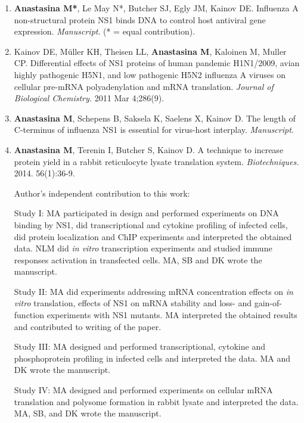 \documentclass[a4paper,12pt]{article} %
\begin{document}
	\begin{enumerate}[I]

	\item \textbf{Anastasina M*}, Le May N*, Butcher SJ, Egly JM, Kainov DE. Influenza A non-structural protein NS1 binds DNA to control host antiviral gene expression. \textit{Manuscript}. (* = equal contribution). \label{DNA}	
	\item 	Kainov DE, M{\"u}ller KH, Theisen LL, \textbf{Anastasina M}, Kaloinen M, Muller CP. Differential effects of NS1 proteins of human pandemic H1N1/2009, avian highly pathogenic H5N1, and low pathogenic H5N2 influenza A viruses on cellular pre-mRNA polyadenylation and mRNA translation. \textit{Journal of Biological Chemistry.} 2011 Mar 4;286(9). \label{Transl}		
	\item \textbf{Anastasina M}, Schepens B, Saksela K, Saelens X, Kainov D. The length of C-terminus of influenza NS1 is essential for virus-host interplay. \textit{Manuscript}. \label{Cterm}	
	\item \textbf{Anastasina M}, Terenin I, Butcher S, Kainov D. A technique to increase protein yield in a rabbit reticulocyte lysate translation system. \textit{Biotechniques.} 2014. 56(1):36-9. \label{RRL}
	
	\pagebreak
	Author's independent contribution to this work:
	\vspace{2 mm}
	
	Study I: MA participated in design and performed experiments on DNA binding by NS1, did transcriptional and cytokine profiling of infected cells, did protein localization and ChIP experiments and interpreted the obtained data. NLM did \textit{in vitro} transcription experiments and studied immune responses activation in transfected cells. MA, SB and DK wrote the manuscript. \vspace{2 mm}
	
	Study II: MA did experiments addressing mRNA concentration effects on \textit{in vitro} translation, effects of NS1 on mRNA stability and loss- and gain-of-function experiments with NS1 mutants. MA interpreted the obtained results and contributed to writing of the paper.\vspace{2 mm}
	
	Study III: MA designed and performed transcriptional, cytokine and phosphoprotein profiling in infected cells and interpreted the data. MA and DK wrote the manuscript.\vspace{2 mm}
	
	Study IV: MA designed and performed experiments on cellular mRNA translation and polysome formation in rabbit lysate and interpreted the data. MA, SB, and DK wrote the manuscript.
	
\end{enumerate}
\end{document}
